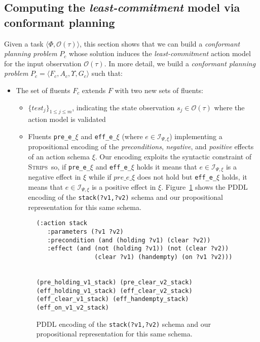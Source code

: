 \documentclass{article}
\newcommand{\tup}[1]{{\langle #1 \rangle}}
\newcommand{\strips}{\textsc{Strips}}
\begin{document}
\subsection{Computing the {\em least-commitment} model via conformant planning}
Given a task $\tup{\Phi,\mathcal{O}(\tau)}$, this section shows that we can build a {\em conformant planning problem} $P_c$ whose solution induces the {\em least-commitment} action model for the input observation $\mathcal{O}(\tau)$. In more detail, we build a {\em conformant planning problem} $P_c=\tup{F_c,A_c,\Upsilon,G_c}$ such that:
\begin{itemize}
\item The set of fluents $F_c$ extends $F$ with two new sets of fluents:
      \begin{itemize}
      \item $\{test_j\}_{1\leq j\leq m}$, indicating the state observation $s_j\in\mathcal{O}(\tau)$ where the action model is validated
      \item Fluents {\tt\small pre\_e\_$\xi$} and {\tt\small eff\_e\_$\xi$} (where $e\in{\mathcal I}_{\Psi,\xi}$) implementing a propositional encoding of the {\em preconditions}, {\em negative}, and {\em positive} effects of an action schema $\xi$. Our encoding exploits the syntactic constraint of \strips\ so, if {\tt\small pre\_e\_$\xi$} and {\tt\small eff\_e\_$\xi$} holds it means that $e\in{\mathcal I}_{\Psi,\xi}$ is a negative effect in $\xi$ while if $pre\_e\_\xi$ does not hold but {\tt\small eff\_e\_$\xi$} holds, it means that $e\in{\mathcal I}_{\Psi,\xi}$ is a positive effect in $\xi$. Figure~\ref{fig:propositional} shows the PDDL encoding of the {\tt\small stack(?v1,?v2)} schema and our propositional representation for this same schema.
      \end {itemize}

\begin{figure}
  \begin{tiny}  
  \begin{verbatim}
(:action stack
   :parameters (?v1 ?v2)
   :precondition (and (holding ?v1) (clear ?v2))
   :effect (and (not (holding ?v1)) (not (clear ?v2))
                (clear ?v1) (handempty) (on ?v1 ?v2)))


(pre_holding_v1_stack) (pre_clear_v2_stack)
(eff_holding_v1_stack) (eff_clear_v2_stack)
(eff_clear_v1_stack) (eff_handempty_stack) (eff_on_v1_v2_stack)
  \end{verbatim}           
  \end{tiny}  
 \caption{\small PDDL encoding of the {\tt\small stack(?v1,?v2)} schema and our propositional representation for this same schema.}
\label{fig:propositional}
\end{figure}


\end{itemize}
\end{document}
